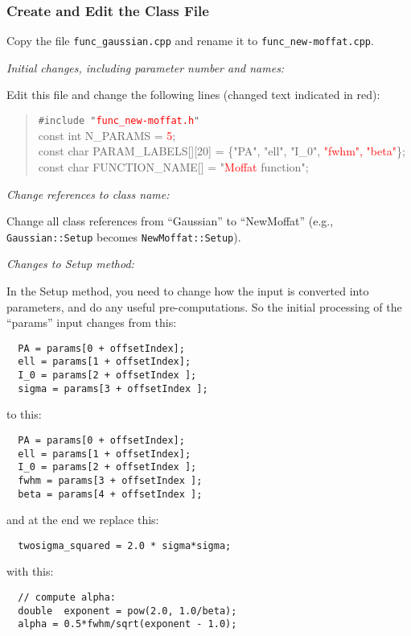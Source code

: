 \documentclass[10pt]{article}
\newcommand{\red}{\textcolor{red}}
\begin{document}
\subsubsection{Create and Edit the Class File}

Copy the file \texttt{func\_gaussian.cpp} and rename it to \texttt{func\_new-moffat.cpp}. 

\bigskip
\noindent \textit{Initial changes, including parameter number and names:}
\smallskip

Edit this file and change the following lines (changed text indicated in red):

\begin{quote}
\texttt{\#include "\red{func\_new-moffat.h}"} \\

const int  N\_PARAMS = \red{5}; \\

const char  PARAM\_LABELS[][20] = \{"PA", "ell", "I\_0", \red{"fwhm", "beta"}\}; \\

const char  FUNCTION\_NAME[] = "\red{Moffat} function";

\end{quote}

\bigskip
\noindent \textit{Change references to class name:}
\smallskip

Change all class references from ``Gaussian'' to ``NewMoffat'' (e.g., \texttt{Gaussian::Setup}
becomes \texttt{NewMoffat::Setup}).

\bigskip
\noindent \textit{Changes to Setup method:}
\smallskip

In the Setup method, you need to change how the input is converted into
parameters, and do any useful pre-computations. So the initial processing of
the ``params'' input changes from this:
\begin{verbatim}
  PA = params[0 + offsetIndex];
  ell = params[1 + offsetIndex];
  I_0 = params[2 + offsetIndex ];
  sigma = params[3 + offsetIndex ];
\end{verbatim}

to this:
\begin{verbatim}
  PA = params[0 + offsetIndex];
  ell = params[1 + offsetIndex];
  I_0 = params[2 + offsetIndex ];
  fwhm = params[3 + offsetIndex ];
  beta = params[4 + offsetIndex ];
\end{verbatim}
and at the end we replace this:
\begin{verbatim}
  twosigma_squared = 2.0 * sigma*sigma;
\end{verbatim}
with this:
\begin{verbatim}
  // compute alpha:
  double  exponent = pow(2.0, 1.0/beta);
  alpha = 0.5*fwhm/sqrt(exponent - 1.0);
\end{verbatim}
\end{document}
